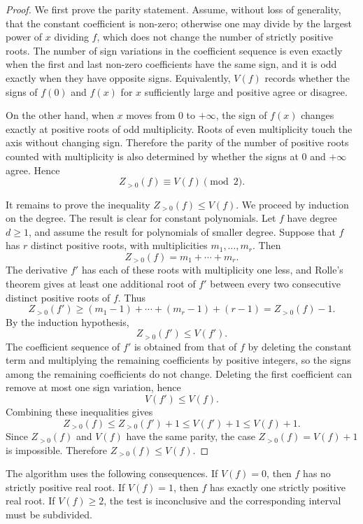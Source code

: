 \documentclass[letterpaper]{article}
\begin{document}
\begin{proof}
We first prove the parity statement. Assume, without loss of generality, that
the constant coefficient is non-zero; otherwise one may divide by the largest
power of $x$ dividing $f$, which does not change the number of strictly
positive roots. The number of sign variations in the coefficient sequence is
even exactly when the first and last non-zero coefficients have the same sign,
and it is odd exactly when they have opposite signs. Equivalently, $V(f)$
records whether the signs of $f(0)$ and $f(x)$ for $x$ sufficiently large and
positive agree or disagree.

On the other hand, when $x$ moves from $0$ to $+\infty$, the sign of $f(x)$
changes exactly at positive roots of odd multiplicity. Roots of even
multiplicity touch the axis without changing sign. Therefore the parity of the
number of positive roots counted with multiplicity is also determined by
whether the signs at $0$ and $+\infty$ agree. Hence
\[
  Z_{>0}(f)\equiv V(f)\pmod 2.
\]

It remains to prove the inequality $Z_{>0}(f)\leq V(f)$. We proceed by
induction on the degree. The result is clear for constant polynomials. Let
$f$ have degree $d\geq 1$, and assume the result for polynomials of smaller
degree. Suppose that $f$ has $r$ distinct positive roots, with multiplicities
$m_1,\ldots,m_r$. Then
\[
  Z_{>0}(f)=m_1+\cdots+m_r.
\]
The derivative $f'$ has each of these roots with multiplicity one less, and
Rolle's theorem gives at least one additional root of $f'$ between every two
consecutive distinct positive roots of $f$. Thus
\[
  Z_{>0}(f')\geq
  (m_1-1)+\cdots+(m_r-1)+(r-1)
  =
  Z_{>0}(f)-1.
\]
By the induction hypothesis,
\[
  Z_{>0}(f')\leq V(f').
\]
The coefficient sequence of $f'$ is obtained from that of $f$ by deleting the
constant term and multiplying the remaining coefficients by positive
integers, so the signs among the remaining coefficients do not change.
Deleting the first coefficient can remove at most one sign variation, hence
\[
  V(f')\leq V(f).
\]
Combining these inequalities gives
\[
  Z_{>0}(f)\leq Z_{>0}(f')+1\leq V(f')+1\leq V(f)+1.
\]
Since $Z_{>0}(f)$ and $V(f)$ have the same parity, the case
$Z_{>0}(f)=V(f)+1$ is impossible. Therefore $Z_{>0}(f)\leq V(f)$.
\end{proof}

The algorithm uses the following consequences. If $V(f)=0$, then $f$ has no
strictly positive real root. If $V(f)=1$, then $f$ has exactly one strictly
positive real root. If $V(f) \geq 2$, the test is inconclusive and the
corresponding interval must be subdivided.
\end{document}
